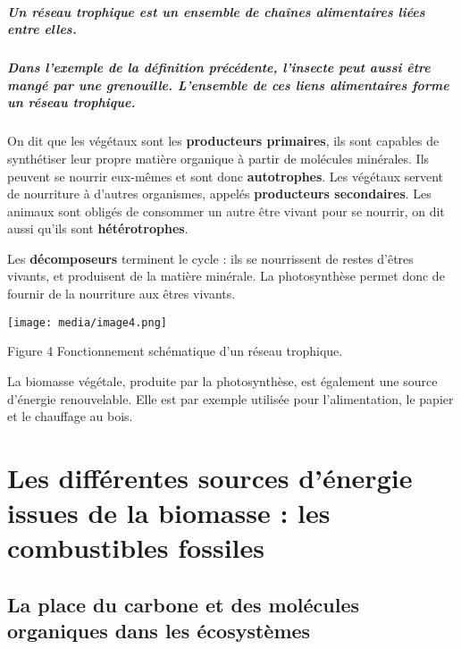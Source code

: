 \begin{itemize}
\subparagraph{Un réseau trophique est un ensemble de chaînes
alimentaires liées entre
elles.}\label{un-ruxe9seau-trophique-est-un-ensemble-de-chauxeenes-alimentaires-liuxe9es-entre-elles.}

\subparagraph{Dans l'exemple de la définition précédente, l'insecte peut
aussi être mangé par une grenouille. L'ensemble de ces liens
alimentaires forme un réseau
trophique.}\label{dans-lexemple-de-la-duxe9finition-pruxe9cuxe9dente-linsecte-peut-aussi-uxeatre-manguxe9-par-une-grenouille.-lensemble-de-ces-liens-alimentaires-forme-un-ruxe9seau-trophique.}

On dit que les végétaux sont les \textbf{producteurs primaires}, ils
sont capables de synthétiser leur propre matière organique à partir de
molécules minérales. Ils peuvent se nourrir eux-mêmes et sont donc
\textbf{autotrophes}. Les végétaux servent de nourriture à d'autres
organismes, appelés \textbf{producteurs secondaires}. Les animaux sont
obligés de consommer un autre être vivant pour se nourrir, on dit aussi
qu'ils sont \textbf{hétérotrophes}.

Les \textbf{décomposeurs} terminent le cycle : ils se nourrissent de
restes d'êtres vivants, et produisent de la matière minérale. La
photosynthèse permet donc de fournir de la nourriture aux êtres vivants.

\texttt{[image: media/image4.png]}

\protect\hypertarget{fonctionnement-schuxe9matique-dun-ruxe9seau-tr}{}{}Figure
4 Fonctionnement schématique d'un réseau trophique.

La biomasse végétale, produite par la photosynthèse, est également une
source d'énergie renouvelable. Elle est par exemple utilisée pour
l'alimentation, le papier et le chauffage au bois.


  \section{Les différentes sources d'énergie issues de la biomasse : les
  combustibles
  fossiles}\label{les-diffuxe9rentes-sources-duxe9nergie-issues-de-la-biomasse-les-combustibles-fossiles}


    \subsection{La place du carbone et des molécules organiques dans les
    écosystèmes}\label{la-place-du-carbone-et-des-moluxe9cules-organiques-dans-les-uxe9cosystuxe8mes}



\end{itemize}
